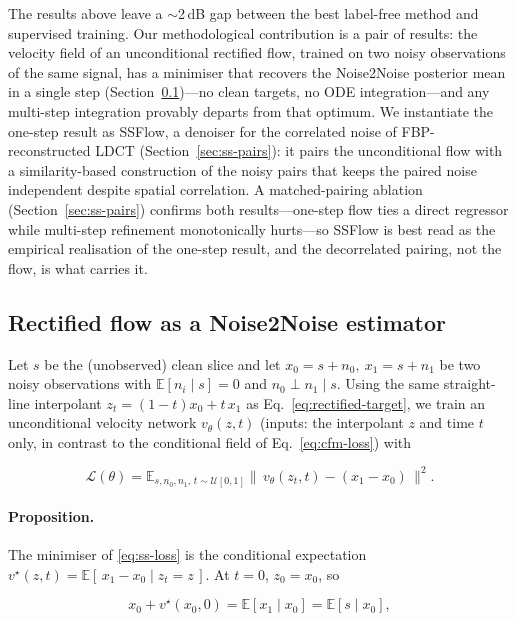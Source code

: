 \documentclass[letterpaper]{article} %
\begin{document}
The results above leave a $\sim$2\,dB gap between the best label-free
method and supervised training.  Our methodological contribution is a pair of
results: the velocity field of an unconditional rectified flow, trained on
two noisy observations of the same signal, has a minimiser that recovers the
Noise2Noise posterior mean in a single step (Section~\ref{sec:rf-n2n})---no
clean targets, no ODE integration---and any multi-step integration provably
departs from that optimum.  We instantiate the one-step result as SSFlow, a
denoiser for the correlated noise of FBP-reconstructed LDCT
(Section~\ref{sec:ss-pairs}): it pairs the unconditional flow with a
similarity-based construction of the noisy pairs that keeps the paired
noise independent despite spatial correlation.  A matched-pairing ablation
(Section~\ref{sec:ss-pairs}) confirms both results---one-step flow ties a direct
regressor while multi-step refinement monotonically hurts---so SSFlow is best
read as the empirical realisation of the one-step result, and the decorrelated
pairing, not the flow, is what carries it.

\subsection{Rectified flow as a Noise2Noise estimator}
\label{sec:rf-n2n}
Let $s$ be the (unobserved) clean slice and let $x_0=s+n_0,\ x_1=s+n_1$ be
two noisy observations with $\mathbb{E}[n_i\mid s]=0$ and
$n_0\perp n_1\mid s$.  Using the same straight-line interpolant
$z_t=(1-t)x_0+t\,x_1$ as Eq.~\eqref{eq:rectified-target}, we train an
unconditional velocity network $v_\theta(z,t)$ (inputs: the
interpolant $z$ and time $t$ only, in contrast to the conditional field of
Eq.~\eqref{eq:cfm-loss}) with

\begin{equation}
  \mathcal{L}(\theta)=
  \mathbb{E}_{s,n_0,n_1,\,t\sim\mathcal{U}[0,1]}
  \big\|\,v_\theta(z_t,t)-(x_1-x_0)\,\big\|^2 .
  \label{eq:ss-loss}
\end{equation}

\paragraph{Proposition.}
The minimiser of \eqref{eq:ss-loss} is the conditional expectation
$v^\star(z,t)=\mathbb{E}[\,x_1-x_0\mid z_t=z\,]$.  At $t=0$, $z_0=x_0$, so

\begin{equation}
  x_0 + v^\star(x_0,0)
  = \mathbb{E}[x_1\mid x_0]
  = \mathbb{E}[s\mid x_0],
  \label{eq:ss-mmse}
\end{equation}
\end{document}
